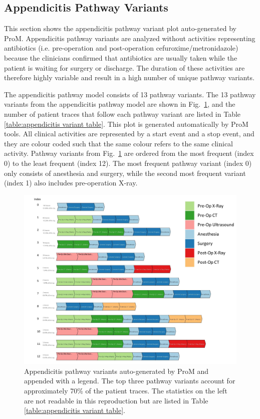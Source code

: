 \documentclass{elsarticle}
\begin{document}
\subsection{Appendicitis Pathway Variants}
This section shows the appendicitis pathway variant plot auto-generated by ProM. Appendicitis pathway variants are analyzed without activities representing antibiotics (i.e. pre-operation and post-operation cefuroxime/metronidazole) because the clinicians confirmed that antibiotics are usually taken while the patient is waiting for surgery or discharge. The duration of these activities are therefore highly variable and result in a high number of unique pathway variants.

The appendicitis pathway model consists of 13 pathway variants. The 13 pathway variants from the appendicitis pathway model are shown in Fig.~\ref{fig:appendicitis pathway variants}, and the number of patient traces that follow each pathway variant are listed in Table \ref{table:appendicitis variant table}. This plot is generated automatically by ProM tools. All clinical activities are represented by a start event and a stop event, and they are colour coded such that the same colour refers to the same clinical activity. Pathway variants from Fig.~\ref{fig:appendicitis pathway variants} are ordered from the most frequent (index 0) to the least frequent (index 12). The most frequent pathway variant (index 0) only consists of anesthesia and surgery, while the second most frequent variant (index 1) also includes pre-operation X-ray.

\begin{figure}[t]
\hspace{-2cm}
\includegraphics[width=1.5\textwidth]{images/appendicitis_variant_index_anes.jpg}
\caption{Appendicitis pathway variants auto-generated by ProM and appended with a legend. The top three pathway variants account for approximately 70\% of the patient traces. The statistics on the left are not readable in this reproduction but are listed in Table \ref{table:appendicitis variant table}.}
\label{fig:appendicitis pathway variants}
\end{figure}
\clearpage
\end{document}
